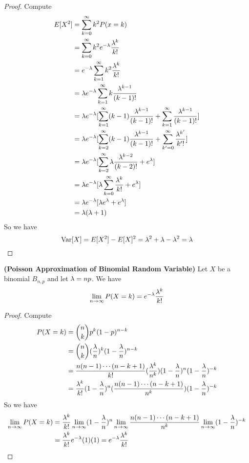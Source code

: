\documentclass{report}
\begin{document}
\begin{proof}
Compute 
\begin{align}
E[X^2]&=\sum_{k=0}^\infty k^2P(x=k)\\
&=\sum_{k=0}^\infty k^2e^{-\lambda }\frac{\lambda^k}{k!}\\
&=e^{-\lambda } \sum_{k=1}^\infty k^2 \frac{\lambda ^k}{k!}\\
&=\lambda e^{-\lambda }\sum_{k=1}^\infty k \frac{\lambda^{k-1}}{(k-1)!}\\
&=\lambda e^{-\lambda }[\sum_{k=1}^\infty (k-1)\frac{\lambda ^{k-1}}{(k-1)!}+\sum_{k=1}^\infty \frac{\lambda ^{k-1}}{(k-1)!}]\\
&=\lambda  e^{-\lambda}[\sum_{k=2}^\infty (k-1) \frac{\lambda ^{k-1}}{(k-1)!}+\sum_{k'=0}^\infty \frac{\lambda ^{k'}}{k'!}]\\
&=\lambda e^{-\lambda }[\sum_{k=2}^\infty \lambda \frac{\lambda ^{k-2}}{(k-2)!}+e^{\lambda }]\\
&=\lambda e^{-\lambda }[\lambda \sum_{k=0}^\infty \frac{\lambda ^k}{k!}+e^\lambda ]\\
&=\lambda e^{-\lambda }[\lambda e^{\lambda }+e^{\lambda }]\\
&=\lambda (\lambda +1)
\end{align}
So we have
\begin{equation}
\text{Var} [X]=E[X^2]-E[X]^2=\lambda ^2+\lambda -\lambda ^2=\lambda 
\end{equation}
\end{proof}
\begin{theorem}
\textbf{(Poisson Approximation of Binomial Random Variable)} Let $X$ be a binomial $B_{n,p}$ and let $\lambda =np$. We have
\begin{equation}
  \lim_{n\to\infty}P(X=k)=e^{-\lambda }\frac{\lambda ^k}{k!}
\end{equation}
\end{theorem}
\begin{proof}
Compute
\begin{align}
P(X=k)&=\binom{n}{k}p^k (1-p)^{n-k}\\
&=\binom{n}{k}(\frac{\lambda }{n})^k(1-\frac{\lambda }{n})^{n-k}\\
&=\frac{n(n-1)\cdots (n-k+1)}{k!}(\frac{\lambda ^k}{n^k})(1-\frac{\lambda }{n})^n(1-\frac{\lambda }{n})^{-k}\\
&=\frac{\lambda ^k}{k!}(1-\frac{\lambda }{n})^n(\frac{n(n-1)\cdots (n-k+1)}{n^k})(1-\frac{\lambda }{n})^{-k}
\end{align}
So we have
\begin{align}
  \lim_{n\to\infty}P(X=k)&=\frac{\lambda ^k}{k!}\lim_{n\to\infty}(1-\frac{\lambda}{n})^n\lim_{n\to\infty}\frac{n(n-1)\cdots (n-k+1)}{n^k}\lim_{n\to\infty}(1-\frac{\lambda}{n})^{-k}\\
&=\frac{\lambda ^k}{k!}e^{-\lambda }(1)(1)=e^{-\lambda }\frac{\lambda ^k}{k!}
\end{align}
\end{proof}
\end{document}
